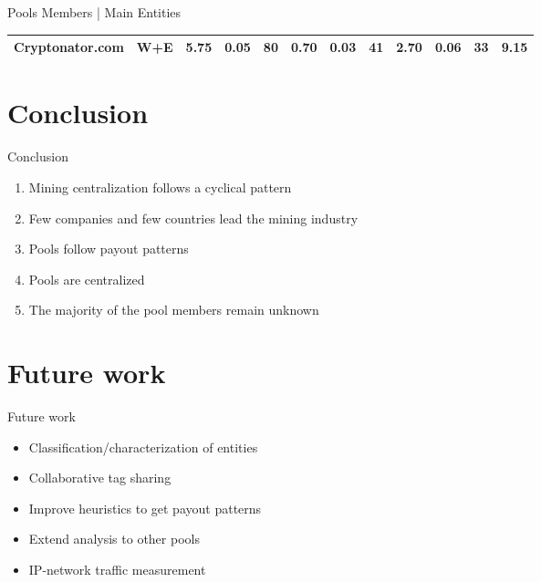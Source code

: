 \documentclass[10pt]{beamer}
\begin{document}
\begin{frame}[fragile]{Pools Members | Main Entities}
\begin{table}
{\begin{tabular}{@{}llrrrrrrrrrr@{}}
            Cryptonator.com     & W+E     & 5.75    & 0.05  & 80          & 0.70    & 0.03  & 41          & 2.70    & 0.06  & 33          & 9.15      \\ 
            \bottomrule
            \end{tabular}
        }
    \end{table} 
\end{frame}

\section{Conclusion} 
\begin{frame}[fragile]{Conclusion}
    \begin{enumerate}
        \item Mining centralization follows a cyclical pattern
        \item Few companies and few countries lead the mining industry 
        \item Pools follow payout patterns
        \item Pools are centralized
        \item The majority of the pool members remain unknown
    \end{enumerate}
\end{frame}

\section{Future work} 
\begin{frame}[fragile]{Future work}
    \begin{itemize}
        \item Classification/characterization of entities 
        \item Collaborative tag sharing
        \item Improve heuristics to get payout patterns
        \item Extend analysis to other pools
        \item IP-network traffic measurement
    \end{itemize}
\end{frame}
 
\end{document}
